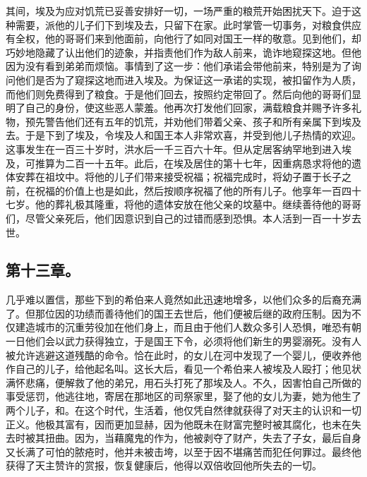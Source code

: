 其间，埃及为应对饥荒已妥善安排好一切，一场严重的粮荒开始困扰天下。迫于这种需要，派他的儿子们下到埃及去，只留下在家。此时掌管一切事务，对粮食供应有全权，他的哥哥们来到他面前，向他行了如同对国王一样的敬意。见到他们，却巧妙地隐藏了认出他们的迹象，并指责他们作为敌人前来，诡诈地窥探这地。但他因为没有看到弟弟而烦恼。事情到了这一步：他们承诺会带他前来，特别是为了询问他们是否为了窥探这地而进入埃及。为保证这一承诺的实现，被扣留作为人质，而他们则免费得到了粮食。于是他们回去，按照约定带回了。然后向他的哥哥们显明了自己的身份，使这些恶人蒙羞。他再次打发他们回家，满载粮食并赐予许多礼物，预先警告他们还有五年的饥荒，并劝他们带着父亲、孩子和所有亲属下到埃及去。于是下到了埃及，令埃及人和国王本人非常欢喜，并受到他儿子热情的欢迎。这事发生在一百三十岁时，洪水后一千三百六十年。但从定居客纳罕地到进入埃及，可推算为二百一十五年。此后，在埃及居住的第十七年，因重病恳求将他的遗体安葬在祖坟中。将他的儿子们带来接受祝福；祝福完成时，将幼子置于长子之前，在祝福的价值上也是如此，然后按顺序祝福了他的所有儿子。他享年一百四十七岁。他的葬礼极其隆重，将他的遗体安放在他父亲的坟墓中。继续善待他的哥哥们，尽管父亲死后，他们因意识到自己的过错而感到恐惧。本人活到一百一十岁去世。\par


\subsection{第十三章。}

几乎难以置信，那些下到的希伯来人竟然如此迅速地增多，以他们众多的后裔充满了。但那位因的功绩而善待他们的国王去世后，他们便被后继的政府压制。因为不仅建造城市的沉重劳役加在他们身上，而且由于他们人数众多引人恐惧，唯恐有朝一日他们会以武力获得独立，于是国王下令，必须将他们新生的男婴溺死。没有人被允许逃避这道残酷的命令。恰在此时，的女儿在河中发现了一个婴儿，便收养他作自己的儿子，给他起名叫。这长大后，看见一个希伯来人被埃及人殴打；他见状满怀悲痛，便解救了他的弟兄，用石头打死了那埃及人。不久，因害怕自己所做的事受惩罚，他逃往地，寄居在那地区的司祭家里，娶了他的女儿为妻，她为他生了两个儿子，和。在这个时代，生活着，他仅凭自然律就获得了对天主的认识和一切正义。他极其富有，因而更加显赫，因为他既未在财富完整时被其腐化，也未在失去时被其扭曲。因为，当藉魔鬼的作为，他被剥夺了财产，失去了子女，最后自身又长满了可怕的脓疮时，他并未被击垮，以至于因不堪痛苦而犯任何罪过。最终他获得了天主赞许的赏报，恢复健康后，他得以双倍收回他所失去的一切。\par


